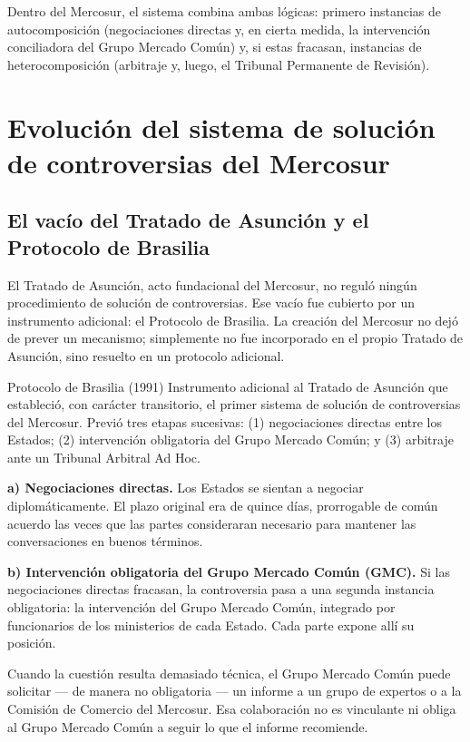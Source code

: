 \documentclass[12pt,oneside]{book}
\begin{document}
Dentro del Mercosur, el sistema combina ambas lógicas: primero instancias de autocomposición (negociaciones directas y, en cierta medida, la intervención conciliadora del Grupo Mercado Común) y, si estas fracasan, instancias de heterocomposición (arbitraje y, luego, el Tribunal Permanente de Revisión).

\section{Evolución del sistema de solución de controversias del Mercosur}

\subsection{El vacío del Tratado de Asunción y el Protocolo de Brasilia}

El Tratado de Asunción, acto fundacional del Mercosur, no reguló ningún procedimiento de solución de controversias. Ese vacío fue cubierto por un instrumento adicional: el Protocolo de Brasilia. La creación del Mercosur no dejó de prever un mecanismo; simplemente no fue incorporado en el propio Tratado de Asunción, sino resuelto en un protocolo adicional.

\begin{definition}{Protocolo de Brasilia (1991)}
Instrumento adicional al Tratado de Asunción que estableció, con carácter transitorio, el primer sistema de solución de controversias del Mercosur. Previó tres etapas sucesivas: (1) negociaciones directas entre los Estados; (2) intervención obligatoria del Grupo Mercado Común; y (3) arbitraje ante un Tribunal Arbitral Ad Hoc.
\end{definition}

\textbf{a) Negociaciones directas.} Los Estados se sientan a negociar diplomáticamente. El plazo original era de quince días, prorrogable de común acuerdo las veces que las partes consideraran necesario para mantener las conversaciones en buenos términos.

\textbf{b) Intervención obligatoria del Grupo Mercado Común (GMC).} Si las negociaciones directas fracasan, la controversia pasa a una segunda instancia obligatoria: la intervención del Grupo Mercado Común, integrado por funcionarios de los ministerios de cada Estado. Cada parte expone allí su posición.

Cuando la cuestión resulta demasiado técnica, el Grupo Mercado Común puede solicitar --- de manera no obligatoria --- un informe a un grupo de expertos o a la Comisión de Comercio del Mercosur. Esa colaboración no es vinculante ni obliga al Grupo Mercado Común a seguir lo que el informe recomiende.
\end{document}
